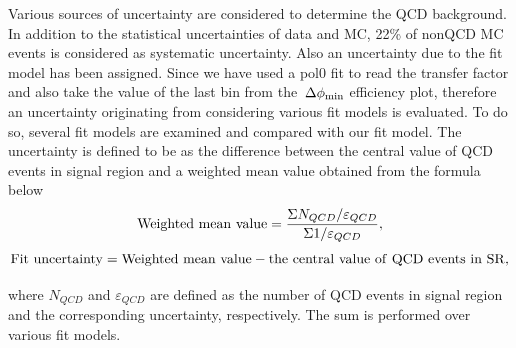 Various sources of uncertainty are considered to determine the QCD background. 
In addition to the statistical uncertainties of data and MC, 22\% of 
nonQCD MC events is considered as systematic uncertainty.
Also an uncertainty due to the fit model has been assigned. Since we have used a pol0 fit 
to read the transfer factor and also take the value of the last bin from the $\,{\Delta\phi_{\rm min}}$ efficiency plot,
therefore an uncertainty originating from considering various fit models is evaluated. To do so, several 
fit models are examined and compared with our fit model. The uncertainty is defined to be as the 
difference between the central value of QCD events in signal region and a weighted mean value obtained from the formula below 
\begin{equation}
{\rm Weighted~mean~value} =\frac{\Sigma N_{QCD}/\varepsilon_{QCD}}{\Sigma 1/\varepsilon_{QCD}},
\end{equation}
\begin{equation}
{\rm Fit~uncertainty} ={\rm Weighted~mean~value}-{\rm the~central~value~of~QCD~events~in~SR},
\end{equation}

where $N_{QCD}$ and $\varepsilon_{QCD}$ are defined as the number of QCD events in signal region and 
the corresponding uncertainty, respectively. The sum is performed over various fit models.\\ 

